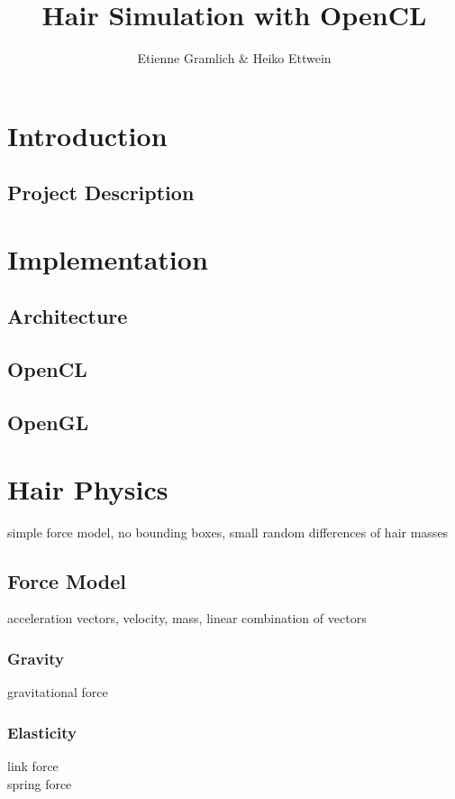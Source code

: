 \documentclass[11pt,a4paper]{scrartcl}
\title{Hair Simulation with OpenCL}
\author{Etienne Gramlich \& Heiko Ettwein}
\begin{document}
\maketitle
\tableofcontents
\newpage
{}

\section{Introduction}

\subsection{Project Description}


\section{Implementation}

\subsection{Architecture}

\subsection{OpenCL}

\subsection{OpenGL}


\section{Hair Physics}
simple force model, no bounding boxes, small random differences of hair masses

\subsection{Force Model}
acceleration vectors, velocity, mass, linear combination of vectors

\subsubsection{Gravity}
gravitational force

\subsubsection{Elasticity}
link force \\ spring force
\end{document}
